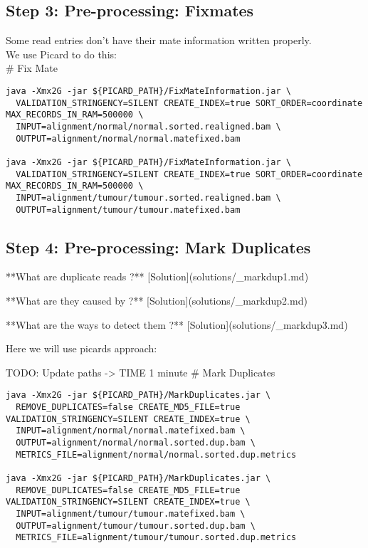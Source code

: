 \subsection{Step 3: Pre-processing: Fixmates}

Some read entries don't have their mate information written properly. \\

We use Picard to do this: \\

# Fix Mate 
\begin{lstlisting}
java -Xmx2G -jar ${PICARD_PATH}/FixMateInformation.jar \
  VALIDATION_STRINGENCY=SILENT CREATE_INDEX=true SORT_ORDER=coordinate MAX_RECORDS_IN_RAM=500000 \
  INPUT=alignment/normal/normal.sorted.realigned.bam \
  OUTPUT=alignment/normal/normal.matefixed.bam

java -Xmx2G -jar ${PICARD_PATH}/FixMateInformation.jar \
  VALIDATION_STRINGENCY=SILENT CREATE_INDEX=true SORT_ORDER=coordinate MAX_RECORDS_IN_RAM=500000 \
  INPUT=alignment/tumour/tumour.sorted.realigned.bam \
  OUTPUT=alignment/tumour/tumour.matefixed.bam
\end{lstlisting}

\subsection{Step 4: Pre-processing: Mark Duplicates}

**What are duplicate reads ?** [Solution](solutions/_markdup1.md)

**What are they caused by ?** [Solution](solutions/_markdup2.md)

**What are the ways to detect them ?** [Solution](solutions/_markdup3.md)

Here we will use picards approach:

TODO: Update paths -> TIME 1 minute
# Mark Duplicates
\begin{lstlisting}
java -Xmx2G -jar ${PICARD_PATH}/MarkDuplicates.jar \
  REMOVE_DUPLICATES=false CREATE_MD5_FILE=true VALIDATION_STRINGENCY=SILENT CREATE_INDEX=true \
  INPUT=alignment/normal/normal.matefixed.bam \
  OUTPUT=alignment/normal/normal.sorted.dup.bam \
  METRICS_FILE=alignment/normal/normal.sorted.dup.metrics

java -Xmx2G -jar ${PICARD_PATH}/MarkDuplicates.jar \
  REMOVE_DUPLICATES=false CREATE_MD5_FILE=true VALIDATION_STRINGENCY=SILENT CREATE_INDEX=true \
  INPUT=alignment/tumour/tumour.matefixed.bam \
  OUTPUT=alignment/tumour/tumour.sorted.dup.bam \
  METRICS_FILE=alignment/tumour/tumour.sorted.dup.metrics
\end{lstlisting}


